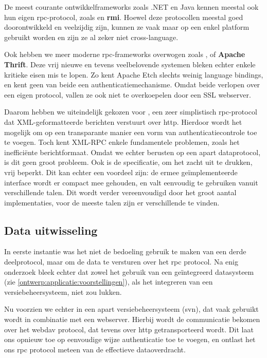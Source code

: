 \documentclass[verslag.tex]{subfiles}
\begin{document}
De meest courante ontwikkelframeworks zoals .NET en Java kennen meestal ook hun eigen \ac{rpc}-protocol, zoals  en \textbf{\ac{rmi}}. Hoewel deze protocollen meestal goed doorontwikkeld en veelzijdig zijn, kunnen ze vaak maar op een enkel platform gebruikt worden en zijn ze al zeker niet cross-language.

Ook hebben we meer moderne \ac{rpc}-frameworks overwogen zoals , of \textbf{Apache Thrift}. Deze vrij nieuwe en tevens veelbelovende systemen bleken echter enkele kritieke eisen mis te lopen. Zo kent Apache Etch slechts weinig language bindings, en kent geen van beide een authenticatiemechanisme. Omdat beide verlopen over een eigen protocol, vallen ze ook niet te overkoepelen door een SSL webserver.

Daarom hebben we uiteindelijk gekozen voor , een zeer simplistisch \ac{rpc}-protocol dat XML-geformatteerde berichten verstuurt over \ac{http}. Hierdoor wordt het mogelijk om op een transparante manier een vorm van authenticatiecontrole toe te voegen. Toch kent XML-RPC enkele fundamentele problemen, zoals het inefficiënte berichtformaat. Omdat we echter berusten op een apart dataprotocol, is dit geen groot probleem. Ook is de specificatie, om het zacht uit te drukken, vrij beperkt. Dit kan echter een voordeel zijn: de ermee geïmplementeerde interface wordt er compact mee gehouden, en valt eenvoudig te gebruiken vanuit verschillende talen. Dit wordt verder vereenvoudigd door het groot aantal implementaties, voor de meeste talen zijn er verschillende te vinden.

\subsection{Data uitwisseling}

In eerste instantie was het niet de bedoeling gebruik te maken van een derde deelprotocol, maar om de data te versturen over het \ac{rpc} protocol. Na enig onderzoek bleek echter dat zowel het gebruik van een geïntegreerd datasysteem (zie \ref{ontwerp:applicatie:voorstellingen}), als het integreren van een versiebeheersysteem, niet zou lukken.

Nu voorzien we echter in een apart versiebeheersysteem (\ac{svn}), dat vaak gebruikt wordt in combinatie met een webserver. Hierbij wordt de communicatie bekomen over het \ac{webdav} protocol, dat tevens over \ac{http} getransporteerd wordt. Dit laat ons opnieuw toe op eenvoudige wijze authenticatie toe te voegen, en ontlast het ons \ac{rpc} protocol meteen van de effectieve dataoverdracht.
\end{document}
